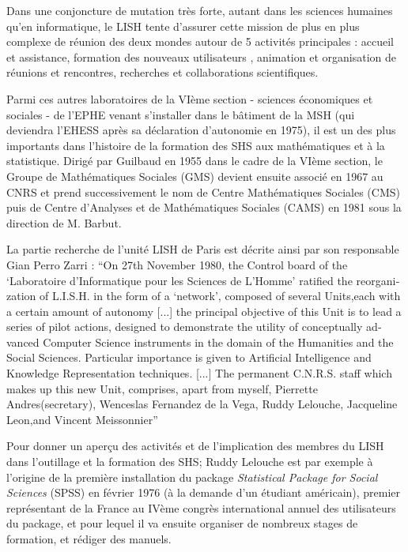 Dans une conjoncture de mutation très forte, autant dans les sciences humaines qu'en informatique, le LISH tente d'assurer cette mission de plus en plus complexe de réunion des deux mondes autour de 5 activités principales : accueil et assistance, formation des nouveaux utilisateurs , animation et organisation de réunions et rencontres, recherches et collaborations scientifiques. \autocite{LISH1980}


Parmi ces autres laboratoires de la VIème section - sciences économiques et sociales - de l'EPHE venant s'installer dans le bâtiment de la MSH (qui deviendra l'EHESS après sa déclaration d'autonomie en 1975), il est un des plus importants dans l'histoire de la formation des SHS aux mathématiques et à la statistique. Dirigé par Guilbaud en 1955 dans le cadre de la VIème section, le Groupe de Mathématiques Sociales (GMS) devient ensuite associé en 1967 au CNRS et prend successivement le nom de Centre Mathématiques Sociales (CMS) puis de Centre d’Analyses et de Mathématiques Sociales (CAMS) en 1981 sous la direction de M. Barbut.

La partie recherche de l'unité LISH de Paris est décrite ainsi par son responsable Gian Perro Zarri : \foreignquote{english}{On 27th November 1980, the Control board of the \enquote{Laboratoire d'Informatique pour les Sciences de L'Homme} ratified the reorganization of L.I.S.H. in the form of a \enquote{network}, composed of several Units,each with a certain amount of autonomy [...] the principal objective of this Unit is to lead a series of pilot actions, designed to demonstrate the utility of conceptually advanced Computer Science instruments in the domain of the Humanities and the Social Sciences. Particular importance is given to Artificial Intelligence and Knowledge Representation techniques. [...]  The permanent C.N.R.S. staff which makes up this new Unit, comprises, apart from myself, Pierrette Andres(secretary), Wenceslas Fernandez de la Vega, Ruddy Lelouche, Jacqueline Leon,and Vincent Meissonnier} \autocite{Zarri1981}

Pour donner un aperçu des activités et de l'implication des membres du LISH dans l'outillage et la formation des SHS; Ruddy Lelouche est par exemple à l'origine de la première installation du package \textit{Statistical Package for Social Sciences} (SPSS) en février 1976 (à la demande d'un étudiant américain), premier représentant de la France au IVème congrès international annuel des utilisateurs du package, et pour lequel il va ensuite organiser de nombreux stages de formation, et rédiger des manuels.

